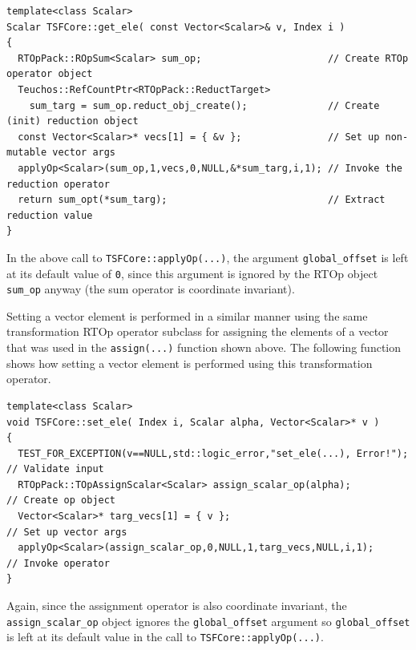 {\scriptsize\begin{verbatim}
template<class Scalar>
Scalar TSFCore::get_ele( const Vector<Scalar>& v, Index i )
{
  RTOpPack::ROpSum<Scalar> sum_op;                      // Create RTOp operator object
  Teuchos::RefCountPtr<RTOpPack::ReductTarget>
    sum_targ = sum_op.reduct_obj_create();              // Create (init) reduction object
  const Vector<Scalar>* vecs[1] = { &v };               // Set up non-mutable vector args
  applyOp<Scalar>(sum_op,1,vecs,0,NULL,&*sum_targ,i,1); // Invoke the reduction operator
  return sum_opt(*sum_targ);                            // Extract reduction value
}
\end{verbatim}}

{}\noindent{}In the above call to {}\texttt{TSFCore::applyOp(\-...)},
the argument {}\texttt{global\_offset} is left at its default value of
{}\texttt{0}, since this argument is ignored by the RTOp object
{}\texttt{sum\_op} anyway (the sum operator is coordinate invariant).

Setting a vector element is performed in a similar manner using the
same transformation RTOp operator subclass for assigning the elements
of a vector that was used in the {}\texttt{assign(...)} function shown
above.  The following function shows how setting a vector element is
performed using this transformation operator.

{\scriptsize\begin{verbatim}
template<class Scalar>
void TSFCore::set_ele( Index i, Scalar alpha, Vector<Scalar>* v )
{
  TEST_FOR_EXCEPTION(v==NULL,std::logic_error,"set_ele(...), Error!"); // Validate input
  RTOpPack::TOpAssignScalar<Scalar> assign_scalar_op(alpha);           // Create op object
  Vector<Scalar>* targ_vecs[1] = { v };                                // Set up vector args
  applyOp<Scalar>(assign_scalar_op,0,NULL,1,targ_vecs,NULL,i,1);       // Invoke operator
}
\end{verbatim}}

{}\noindent{}Again, since the assignment operator is also coordinate
invariant, the {}\texttt{assign\_scalar\_op} object ignores the
{}\texttt{global\_offset} argument so {}\texttt{global\_offset} is
left at its default value in the call to
{}\texttt{TSFCore::applyOp(\-...)}.

